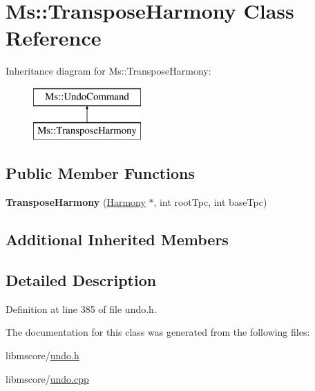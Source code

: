\hypertarget{class_ms_1_1_transpose_harmony}{}\section{Ms\+:\+:Transpose\+Harmony Class Reference}
\label{class_ms_1_1_transpose_harmony}
Inheritance diagram for Ms\+:\+:Transpose\+Harmony\+:\begin{figure}[H]
\begin{center}
\leavevmode
\includegraphics[height=2.000000cm]{class_ms_1_1_transpose_harmony}
\end{center}
\end{figure}
\subsection*{Public Member Functions}
\begin{DoxyCompactItemize}
\item 
\mbox{\label{class_ms_1_1_transpose_harmony_a24547cd4923183444e185466c357dd0c}} 
{\bfseries Transpose\+Harmony} (\hyperlink{class_ms_1_1_harmony}{Harmony} $\ast$, int root\+Tpc, int base\+Tpc)
\end{DoxyCompactItemize}
\subsection*{Additional Inherited Members}


\subsection{Detailed Description}


Definition at line 385 of file undo.\+h.



The documentation for this class was generated from the following files\+:\begin{DoxyCompactItemize}
\item 
libmscore/\hyperlink{undo_8h}{undo.\+h}\item 
libmscore/\hyperlink{undo_8cpp}{undo.\+cpp}\end{DoxyCompactItemize}
